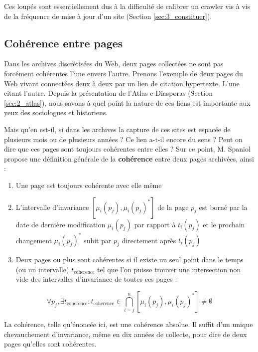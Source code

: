 \documentclass[symmetric,justified,marginals=raggedouter]{tufte-book}
\begin{document}
\noindent Ces loupés sont essentiellement dus à la difficulté de calibrer un crawler vis à vis de la fréquence de mise à jour d'un site (Section \ref{sec:3_constituer}).

\subsection{Cohérence entre pages}

\noindent Dans les archives discrétisées du Web, deux pages collectées ne sont pas forcément cohérentes l'une envers l'autre. Prenons l'exemple de deux pages du Web vivant connectées deux à deux par un lien de citation hypertexte. L'une citant l'autre. Depuis la présentation de l'Atlas e-Diasporas (Section \ref{sec:2_atlas}), nous savons à quel point la nature de ces liens est importante aux yeux des sociologues et historiens.

Mais qu'en est-il, si dans les archives la capture de ces sites est espacée de plusieurs mois ou de plusieurs années ? Ce lien a-t-il encore du sens ? Peut on dire que ces pages sont toujours cohérentes entre elles ? Sur ce point, M. Spaniol \citep{spaniol_data_2009} propose une définition générale de la \textbf{cohérence} entre deux pages archivées, ainsi :

\begin{itshape}
\begin{enumerate}[leftmargin=*]  
\item Une page est toujours cohérente avec elle même
\item L'intervalle d'invariance $[\mu_i(p_j),\mu_i(p_j)^*]$ de la page $p_j$ est borné par la date de dernière modification $\mu_i(p_j)$ par rapport à $ t_i(p_j)$ et le prochain changement $\mu_i(p_j)^*$ subit par $p_j$ directement après $t_i(p_j)$
\item Deux pages ou plus sont cohérentes si il existe un seul point dans le temps (ou un intervalle) $t_{\mathrm{coherence}}$ tel que l'on puisse trouver une intersection non vide des intervalles d'invariance de toutes ces pages :
\end{enumerate}
\[
	\forall p_j, \exists t_{\mathrm{coherence}}:t_{\mathrm{coherence}} \in \bigcap^n_{i=j}[\mu_i(p_j),\mu_i(p_j)^*] \neq \emptyset
\]
\end{itshape}

\noindent La cohérence, telle qu'énoncée ici, est une cohérence absolue. Il suffit d'un unique chevauchement d'invariance, même en dix années de collecte, pour dire de deux pages qu'elles sont cohérentes.
\end{document}
